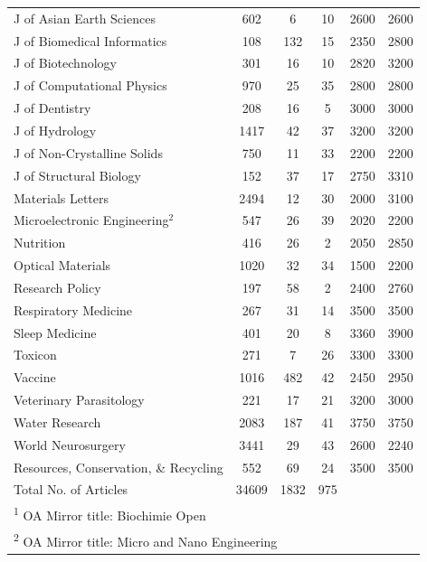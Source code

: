 \documentclass[
  english,
  man]{apa6}
\begin{document}
\begin{table}
{\begin{tabular}[t]{lccccc}
J of Asian Earth Sciences & 602 & 6 & 10 & 2600 & 2600\\
J of Biomedical Informatics & 108 & 132 & 15 & 2350 & 2800\\
J of Biotechnology & 301 & 16 & 10 & 2820 & 3200\\
J of Computational Physics & 970 & 25 & 35 & 2800 & 2800\\
J of Dentistry & 208 & 16 & 5 & 3000 & 3000\\
J of Hydrology & 1417 & 42 & 37 & 3200 & 3200\\
J of Non-Crystalline Solids & 750 & 11 & 33 & 2200 & 2200\\
J of Structural Biology & 152 & 37 & 17 & 2750 & 3310\\
Materials Letters & 2494 & 12 & 30 & 2000 & 3100\\
Microelectronic Engineering$^{2}$ & 547 & 26 & 39 & 2020 & 2200\\
Nutrition & 416 & 26 & 2 & 2050 & 2850\\
Optical Materials & 1020 & 32 & 34 & 1500 & 2200\\
Research Policy & 197 & 58 & 2 & 2400 & 2760\\
Respiratory Medicine & 267 & 31 & 14 & 3500 & 3500\\
Sleep Medicine & 401 & 20 & 8 & 3360 & 3900\\
Toxicon & 271 & 7 & 26 & 3300 & 3300\\
Vaccine & 1016 & 482 & 42 & 2450 & 2950\\
Veterinary Parasitology & 221 & 17 & 21 & 3200 & 3000\\
Water Research & 2083 & 187 & 41 & 3750 & 3750\\
World Neurosurgery & 3441 & 29 & 43 & 2600 & 2240\\
Resources, Conservation, \& Recycling & 552 & 69 & 24 & 3500 & 3500\\
\midrule
Total No. of Articles & 34609 & 1832 & 975 &  & \\
\bottomrule
\multicolumn{6}{l}{\rule{0pt}{1em}\textsuperscript{1} OA Mirror title: Biochimie Open}\\
\multicolumn{6}{l}{\rule{0pt}{1em}\textsuperscript{2} OA Mirror title: Micro and Nano Engineering}\\
\end{tabular}}
\end{table}
\end{document}
